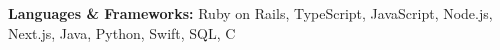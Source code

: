 \textbf{Languages \& Frameworks:} Ruby on Rails, TypeScript, JavaScript, Node.js, Next.js, Java, Python, Swift, SQL, C \\
